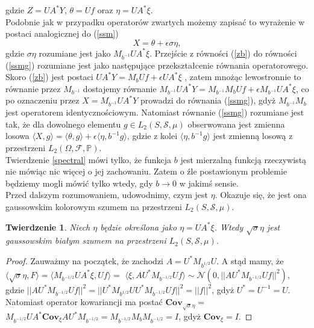 \documentclass{mwart}
\newtheorem{tw}{Twierdzenie}
\begin{document}
gdzie $Z=UA^*Y$, $\theta =Uf$ oraz $\eta =UA^*\xi$.\\
Podobnie jak w przypadku operatorów zwartych możemy zapisać to wyrażenie w postaci analogicznej do (\ref{ssm})
\begin{equation}\label{ssmg}
X=\theta +\epsilon\sigma\eta,
\end{equation}
gdzie $\sigma\eta$ rozumiane jest jako $M_{b^{-1}}UA^*\xi$. Przejście z równości (\ref{zb}) do równości (\ref{ssmg}) rozumiane jest jako następujące przekształcenie równania operatorowego. Skoro (\ref{zb}) jest postaci $UA^*Y=M_bUf+\epsilon UA^*\xi$ , zatem mnożąc lewostronnie to równanie przez $M_{b^{-1}}$ dostajemy równanie $M_{b^{-1}}UA^*Y=M_{b^{-1}}M_bUf+\epsilon M_{b^{-1}}UA^*\xi$, co po oznaczeniu przez $X=M_{b^{-1}}UA^*Y$ prowadzi do równania (\ref{ssmg}), gdyż $M_{b^{-1}}M_b$ jest operatorem identycznościowym. Natomiast równanie (\ref{ssmg}) rozumiane jest tak, że dla dowolnego elementu $g\in L_2(S,\mathcal{S},\mu )$ obserwowana jest zmienna losowa $\langle X,g\rangle = \langle \theta,g\rangle +\epsilon \langle \eta, b^{-1}g\rangle$, gdzie z kolei $\langle \eta,  b^{-1}g\rangle$ jest zmienną losową z przestrzeni $L_2(\Omega,\mathcal{F},\mathbb{P})$.\\
\indent Twierdzenie \ref{spectral} mówi tylko, że funkcja $b$ jest mierzalną funkcją rzeczywistą nie mówiąc nic więcej o jej zachowaniu. Zatem o źle postawionym problemie będziemy mogli mówić tylko wtedy, gdy $b\to 0$ w jakimś sensie.\\
Przed dalszym rozumowaniem, udowodnimy, czym jest $\eta$. Okazuje się, że jest ona gaussowskim kolorowym szumem na przestrzeni $L_2(S,\mathcal{S},\mu )$.
\begin{tw}
Niech $\eta$ będzie określona jako $\eta=UA^*\xi$. Wtedy $\sqrt{\sigma} \eta$  jest gaussowskim białym szumem na przestrzeni $L_2(S,\mathcal{S},\mu )$.
\end{tw}
\begin{proof}
Zauważmy na początek, że zachodzi $A=U^*M_{b^{1/2}}U$. A stąd mamy, że $\langle \sqrt{\sigma} \eta, F\rangle = \langle M_{b^{-1/2}}UA^*\xi, Uf\rangle =$ $\langle \xi,AU^*M_{b^{-1/2}}Uf\rangle \sim \mathcal{N}(0,||AU^*M_{b^{-1/2}}Uf||^2)$, gdzie $||AU^*M_{b^{-1/2}}Uf||^2=||U^*M_{b^{1/2}}UU^*M_{b^{-1/2}}Uf||^2=||f||^2$, gdyż $U^*=U^{-1}=U$. Natomiast operator kowariancji ma postać $\textbf{Cov}_{\sqrt{\sigma}\eta}=$\\ $M_{b^{-1/2}}UA^*\textbf{Cov}_{\xi}AU^*M_{b^{-1/2}}=M_{b^{-1/2}}M_bM_{b^{-1/2}}=I$, gdyż $\textbf{Cov}_{\xi}=I$.
\end{proof}
\end{document}
